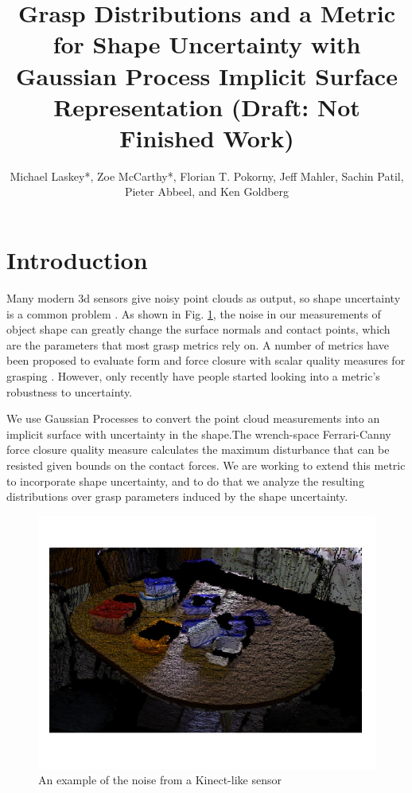 \documentclass[letterpaper, 10 pt, conference]{ieeeconf}  %
\title{\LARGE \bf
Grasp Distributions and a Metric for Shape Uncertainty with Gaussian Process Implicit Surface Representation (Draft: Not Finished Work) }
\author{Michael Laskey*, Zoe McCarthy*, Florian T. Pokorny, Jeff Mahler, Sachin Patil, Pieter Abbeel, and Ken Goldberg}%
\begin{document}
\maketitle
\thispagestyle{empty}
\pagestyle{empty}





\section{Introduction}

\vspace{10pt}
Many modern 3d sensors give noisy point clouds as output, so shape uncertainty is a common problem \cite{singhbigbird}. As shown in Fig. \ref{fig:noisy data}, the noise in our measurements of object shape can greatly change the surface normals and contact points, which are the parameters that most grasp metrics rely on.  A number of metrics have been proposed to evaluate form and force closure with scalar quality measures for grasping \cite{bicchi2000}.   However, only recently have people started looking into a metric's robustness to uncertainty. 
 
We use Gaussian Processes \cite{rasmussen2006} to convert the point cloud measurements into an implicit surface with uncertainty in the shape.The wrench-space Ferrari-Canny force closure quality measure \cite{ferrari1992} calculates the maximum disturbance that can be resisted given bounds on the contact forces.
We are working to extend this metric to incorporate shape uncertainty, and to do that we analyze the resulting distributions over grasp parameters induced by the shape uncertainty. 



\begin{figure}[ht!]
\centering
\includegraphics[scale = 0.3]{figures/Slide02.jpg}
\caption{An example of the noise from a Kinect-like sensor}
\vspace*{-10pt}
\label{fig:noisy data}
\end{figure}
\end{document}
